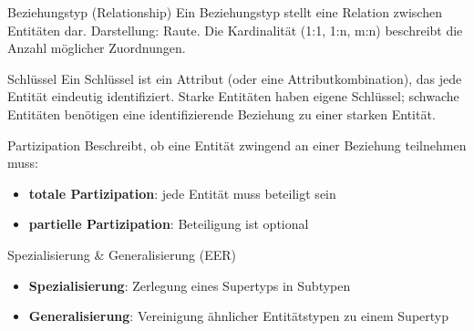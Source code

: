 \documentclass{article}
\begin{document}
\begin{block}{Beziehungstyp (Relationship)}
Ein Beziehungstyp stellt eine Relation zwischen Entitäten dar. Darstellung: Raute. Die Kardinalität (1:1, 1:n, m:n) beschreibt die Anzahl möglicher Zuordnungen.
\end{block}

\begin{block}{Schlüssel}
Ein Schlüssel ist ein Attribut (oder eine Attributkombination), das jede Entität eindeutig identifiziert. Starke Entitäten haben eigene Schlüssel; schwache Entitäten benötigen eine identifizierende Beziehung zu einer starken Entität.
\end{block}

\begin{block}{Partizipation}
Beschreibt, ob eine Entität zwingend an einer Beziehung teilnehmen muss:
\begin{itemize}
  \item \textbf{totale Partizipation}: jede Entität muss beteiligt sein
  \item \textbf{partielle Partizipation}: Beteiligung ist optional
\end{itemize}
\end{block}

\begin{block}{Spezialisierung \& Generalisierung (EER)}
\begin{itemize}
  \item \textbf{Spezialisierung}: Zerlegung eines Supertyps in Subtypen
  \item \textbf{Generalisierung}: Vereinigung ähnlicher Entitätstypen zu einem Supertyp
\end{itemize}
\end{block}
\end{document}
